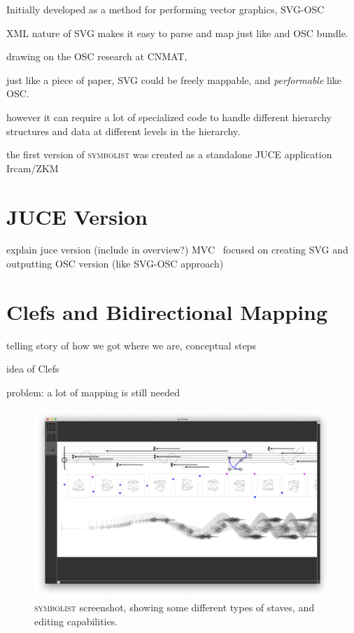 \documentclass{article}
\def\symbolist{\textsc{symbolist}\xspace}
\begin{document}
Initially developed as a method for performing vector graphics, 
SVG-OSC  \cite{gottfried2015svg}

\cite{maccallum2015dynamic} %
\cite{freed2014io} %


XML nature of SVG makes it easy to parse and map just like and OSC bundle.

drawing on the OSC research at CNMAT, 

just like a piece of paper, SVG could be freely mappable, and \textit{performable} like OSC.





however it can require a lot of specialized code to handle different hierarchy structures and data at different levels in the hierarchy.


the first version of \symbolist was created as a standalone JUCE application
Ircam/ZKM~\cite{gottfried2018symbolist}

\section{JUCE Version}\label{sec:juce_version}

explain juce version (include in overview?)
MVC~\cite{krasner1988description}
focused on creating SVG and outputting OSC version (like SVG-OSC approach)


\section{Clefs and Bidirectional Mapping}\label{sec:bidirectional_mapping}

telling story of how we got where we are, conceptual steps

idea of Clefs

problem:
a lot of mapping is still needed



\begin{figure}[ht!]
\centering
\includegraphics[width=2\columnwidth]{symbolist.png}
\caption{ \symbolist screenshot, showing some different types of staves, and editing capabilities.
\label{fig:screenshot}}
\end{figure}
\end{document}
